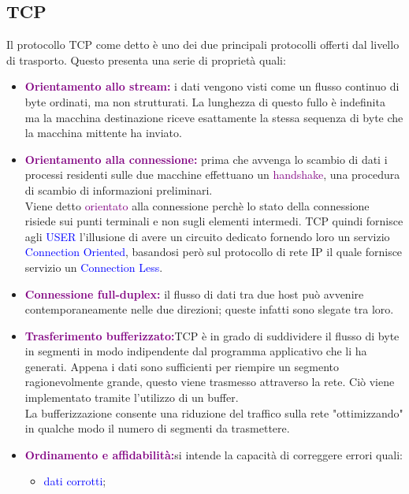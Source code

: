 \subsection{TCP}
Il protocollo TCP come detto è uno dei due principali protocolli offerti dal livello di trasporto.
Questo presenta una serie di proprietà quali:
\begin{itemize}
    \item \textbf{\textcolor{purple}{Orientamento allo stream:}} i dati vengono visti come un flusso continuo di byte ordinati, ma non strutturati. 
    La lunghezza di questo fullo è indefinita ma la macchina destinazione riceve esattamente la stessa sequenza di byte che la macchina mittente ha inviato.
    \item \textbf{\textcolor{purple}{Orientamento alla connessione:}} prima che avvenga lo scambio di dati i processi residenti sulle due macchine effettuano un \textcolor{purple}{handshake}, una procedura di scambio di informazioni preliminari. 
    \\Viene detto \textcolor{purple}{orientato} alla connessione perchè lo stato della connessione risiede sui punti terminali e non sugli elementi intermedi.
    TCP quindi fornisce agli \textcolor{blue}{USER} l'illusione di avere un circuito dedicato fornendo loro un servizio \textcolor{blue}{Connection Oriented}, basandosi però sul protocollo di rete IP il quale fornisce servizio un \textcolor{blue}{Connection Less}.
    \item \textbf{\textcolor{purple}{Connessione full-duplex:}} il flusso di dati tra due host può avvenire contemporaneamente nelle due direzioni; queste infatti sono slegate tra loro.
    \item \textbf{\textcolor{purple}{Trasferimento bufferizzato:}}TCP è in grado di suddividere il flusso di byte in segmenti in modo indipendente dal programma applicativo che li ha generati. 
    Appena i dati sono sufficienti per riempire un segmento ragionevolmente grande, questo viene trasmesso attraverso la rete. Ciò viene implementato tramite l'utilizzo di un buffer.
    \\La bufferizzazione consente una riduzione del traffico sulla rete "ottimizzando" in qualche modo il numero di segmenti da trasmettere.
    \item \textbf{\textcolor{purple}{Ordinamento e affidabilità:}}si intende la capacità di correggere errori quali:
    \begin{itemize}
        \item \textcolor{blue}{dati corrotti};

\end{itemize}
\end{itemize}
